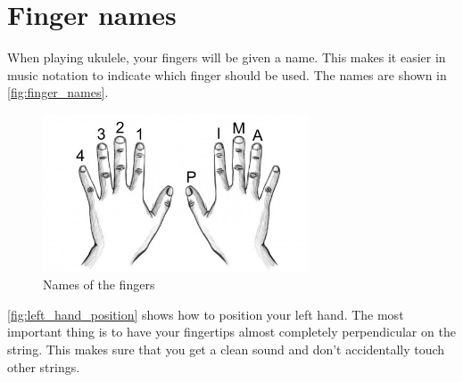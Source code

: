 \section{Finger names}

When playing ukulele, your fingers will be given a name. This makes it easier in music notation to indicate which finger should be used. The names are shown in \autoref{fig:finger_names}.

\begin{figure}[h]
    \centering
    \includegraphics[width=0.7\textwidth]{../../Images/guitar-finger-tips_pima.jpg}
    \caption{Names of the fingers \cite{FingerNames}}
    \label{fig:finger_names}
\end{figure}

\autoref{fig:left_hand_position} shows how to position your left hand. The most important thing is to have your fingertips almost completely perpendicular on the string. This makes sure that you get a clean sound and don't accidentally touch other strings.

